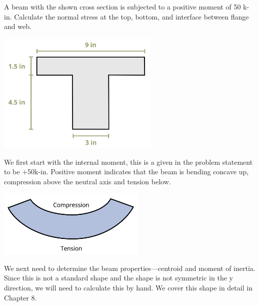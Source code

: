 \documentclass[
  letterpaper,
  DIV=11,
  numbers=noendperiod]{scrreprt}
\begin{document}
\begin{tcolorbox}[enhanced jigsaw, colback=white, colframe=quarto-callout-note-color-frame, leftrule=.75mm, opacitybacktitle=0.6, colbacktitle=quarto-callout-note-color!10!white, arc=.35mm, bottomrule=.15mm, breakable, title={Example 9.1: Simple bending stress problem\,}, left=2mm, titlerule=0mm, toptitle=1mm, toprule=.15mm, opacityback=0, rightrule=.15mm, coltitle=black, bottomtitle=1mm]

A beam with the shown cross section is subjected to a positive moment of
50 k-in. Calculate the normal stress at the top, bottom, and interface
between flange and web.

\begin{center}
\includegraphics[width=3.04167in,height=\textheight]{images/CH9 PNGs/Example 9.1 part 1.png}
\end{center}

We first start with the internal moment, this is a given in the problem
statement to be +50k-in. Positive moment indicates that the beam is
bending concave up, compression above the neutral axis and tension
below.

\begin{center}
\includegraphics[width=2.78125in,height=\textheight]{images/CH9 PNGs/Example 9.1 part 2.png}
\end{center}

We next need to determine the beam properties---centroid and moment of
inertia. Since this is not a standard shape and the shape is not
symmetric in the y direction, we will need to calculate this by hand. We
cover this shape in detail in Chapter 8.


\end{tcolorbox}
\end{document}
